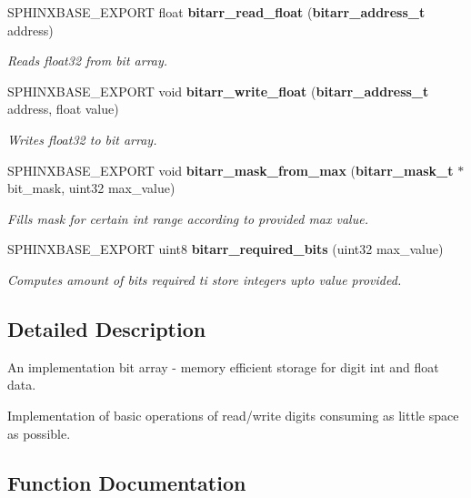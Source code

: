 \begin{DoxyCompactItemize}
S\+P\+H\+I\+N\+X\+B\+A\+S\+E\+\_\+\+E\+X\+P\+O\+R\+T float {\bf bitarr\+\_\+read\+\_\+float} ({\bf bitarr\+\_\+address\+\_\+t} address)
\begin{DoxyCompactList}\small\item\em Reads float32 from bit array. \end{DoxyCompactList}\item 
S\+P\+H\+I\+N\+X\+B\+A\+S\+E\+\_\+\+E\+X\+P\+O\+R\+T void {\bf bitarr\+\_\+write\+\_\+float} ({\bf bitarr\+\_\+address\+\_\+t} address, float value)
\begin{DoxyCompactList}\small\item\em Writes float32 to bit array. \end{DoxyCompactList}\item 
S\+P\+H\+I\+N\+X\+B\+A\+S\+E\+\_\+\+E\+X\+P\+O\+R\+T void {\bf bitarr\+\_\+mask\+\_\+from\+\_\+max} ({\bf bitarr\+\_\+mask\+\_\+t} $\ast$bit\+\_\+mask, uint32 max\+\_\+value)
\begin{DoxyCompactList}\small\item\em Fills mask for certain int range according to provided max value. \end{DoxyCompactList}\item 
S\+P\+H\+I\+N\+X\+B\+A\+S\+E\+\_\+\+E\+X\+P\+O\+R\+T uint8 {\bf bitarr\+\_\+required\+\_\+bits} (uint32 max\+\_\+value)
\begin{DoxyCompactList}\small\item\em Computes amount of bits required ti store integers upto value provided. \end{DoxyCompactList}\end{DoxyCompactItemize}


\subsection{Detailed Description}
An implementation bit array -\/ memory efficient storage for digit int and float data. 

Implementation of basic operations of read/write digits consuming as little space as possible. 

\subsection{Function Documentation}
